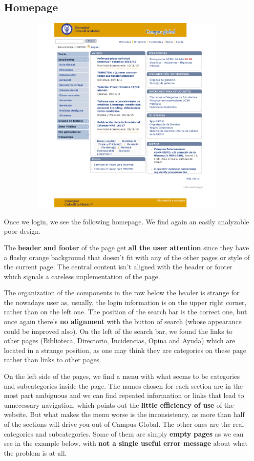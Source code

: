 \documentclass{article}
\begin{document}
\subsection{Homepage}
\vspace{0.3cm}
\begin{center}
\includegraphics[width=15cm, height=10cm, keepaspectratio]{campus}
\end{center}


Once we login, we see the following homepage. We find again an easily analyzable poor design. 

The \textbf{header and footer} of the page get \textbf{all the user attention} since they have a flashy orange background that doesn’t fit with any of the other pages or style of the current page.  
The central content isn’t aligned with the header or footer which signals a careless implementation of the page. 

The organization of the components in the row below the header is strange for the nowadays user as, usually, the login information is on the upper right corner, rather than on the left one. The position of the search bar is the correct one, but once again there’s \textbf{no alignment} with the button of search (whose appearance could be improved also).  On the left of the search bar, we found the links to other pages (Biblioteca, Directorio, Incidencias, Opina and Ayuda) which are located in a strange position, as one may think they are categories on these page rather than links to other pages. 

On the left side of the pages, we find a menu with what seems to be categories and subcategories inside the page. The names chosen for each section are in the most part ambiguous and we can find repeated information or links that lead to unnecessary navigation, which points out the \textbf{little efficiency of use} of the website. But what makes the menu worse is the inconsistency, as more than half of the sections will drive you out of Campus Global. The other ones are the real categories and subcategories. Some of them are simply \textbf{empty pages} as we can see in the example below, with \textbf{not a single useful error message} about what the problem is at all.
\end{document}
